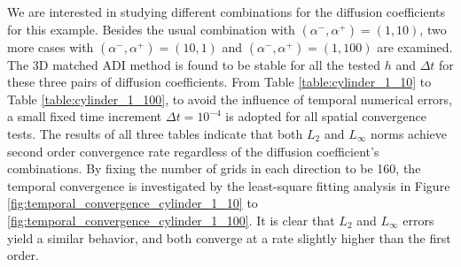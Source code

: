 \documentclass[dissertation]{uathesis}
\begin{document}
\begin{body}
\begin{flushleft}
\hspace{1cm} We are interested in studying different combinations for the diffusion coefficients for this example. 
Besides the usual combination with $(\alpha^{-},\alpha^{+})=(1,10)$, two more cases with $(\alpha^{-},\alpha^{+})=(10,1)$ and $(\alpha^{-},\alpha^{+})=(1,100)$ are examined. 
The 3D matched ADI method is found to be stable for all the tested $h$ and $\Delta t$ 
for these three pairs of diffusion coefficients. 
From Table \ref{table:cylinder_1_10} to Table \ref{table:cylinder_1_100}, to avoid the influence of temporal numerical errors, a small fixed time increment $\Delta t=10^{-4}$ is adopted for all spatial convergence tests. The results of all three tables indicate that both $L_2$ and $L_{\infty}$ norms achieve second order convergence rate regardless of the diffusion coefficient's combinations. 
By fixing the number of grids in each direction to be 160,
the temporal convergence is investigated by
the least-square fitting analysis
in Figure \ref{fig:temporal_convergence_cylinder_1_10} to \ref{fig:temporal_convergence_cylinder_1_100}.
It is clear that $L_2$ and $L_{\infty}$ errors yield a similar behavior, and both converge at 
a rate slightly higher than the first order. 


\end{flushleft}
\end{body}
\end{document}

